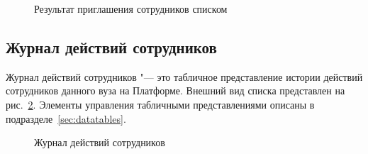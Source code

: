 \begin{figure}[H]
	\caption{Результат приглашения сотрудников списком}
	\label{img:employee:mass_invite_result}
\end{figure}

\subsection{Журнал действий сотрудников}
Журнал действий сотрудников "--- это табличное представление истории действий сотрудников данного вуза на Платформе.
Внешний вид списка представлен на рис.~\ref{img:employee:log_list}. 
Элементы управления табличными представлениями описаны в подразделе~\ref{sec:datatables}.
\begin{figure}[H]
	\caption{Журнал действий сотрудников}
	\label{img:employee:log_list}
\end{figure}

